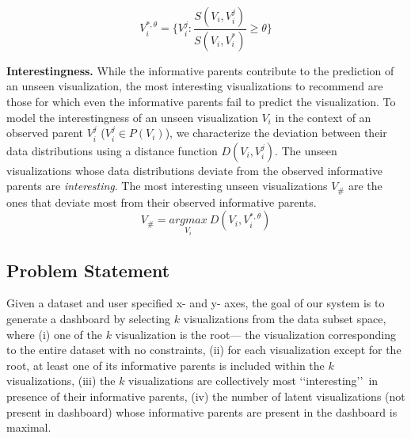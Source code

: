 \begin{equation}
    V_i^{*, \theta} = \{V_i^j : \frac{S(V_i, V_i^j)}{S(V_i, V_i^*)} \ge \theta\}
\end{equation}

\textbf{Interestingness.} While the informative parents contribute to the prediction of an unseen visualization, the most interesting visualizations to recommend are those for which even the informative parents fail to predict the visualization. To model the interestingness of an unseen visualization $V_i$ in the context of an observed parent $V_i^j$ ($V_i^j \in P(V_i)$), we characterize the deviation between their data distributions using a distance function $D(V_i, V_i^j)$. The unseen visualizations whose data distributions deviate from the observed informative parents are \emph{interesting}. The most interesting unseen visualizations $V_\#$ are the ones that deviate most from their observed informative parents.
\begin{equation}
    V_\#=\underset{V_i}{argmax} \ D(V_i, V_i^{*, \theta})
\end{equation}


\subsection{Problem Statement}

Given a dataset and user specified x- and y- axes, the goal of our system is to generate a dashboard by selecting $k$ visualizations from the data subset space, where (i) one of the $k$ visualization is the root--- the visualization corresponding to the entire dataset with no constraints, (ii) for each visualization except for the root, at least one of its informative parents is included within the $k$ visualizations, (iii) the $k$ visualizations are collectively most \lq\lq interesting\rq\rq\ in presence of their informative parents, (iv) the number of latent visualizations (not present in dashboard) whose informative parents are present in the dashboard is maximal.

